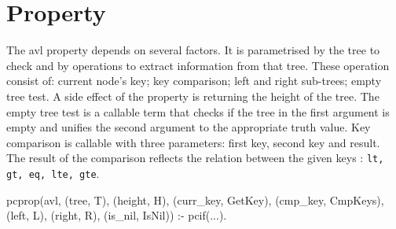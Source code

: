 \documentclass[11pt]{article}
\newcommand{\yap}[1]{\lstinline[style=yap]{#1}}
\begin{document}


\section*{Property}


The avl property depends on several factors.
%
It is parame\-trised by the tree to check and by operations to extract
information from that tree.
%
These operation consist of: current node's key; key comparison; left and
right sub-trees; empty tree test.
%
A side effect of the property is returning the height of the tree.
%
The empty tree test is a callable term that checks if the tree in the
first argument is empty and unifies the second argument to the
appropriate truth value.
%
Key comparison is callable with three parameters: first key, second key
and result.
%
The result of the comparison reflects the relation between the given
keys : \yap{lt, gt, eq, lte, gte}.
%
\begin{yapcode}
 pcprop({avl, (tree, T), (height, H),
      (curr_key, GetKey), (cmp_key, CmpKeys),
      (left, L), (right, R),
      (is_nil, IsNil)}) :- 
   pcif(...).
\end{yapcode}
\end{document}
